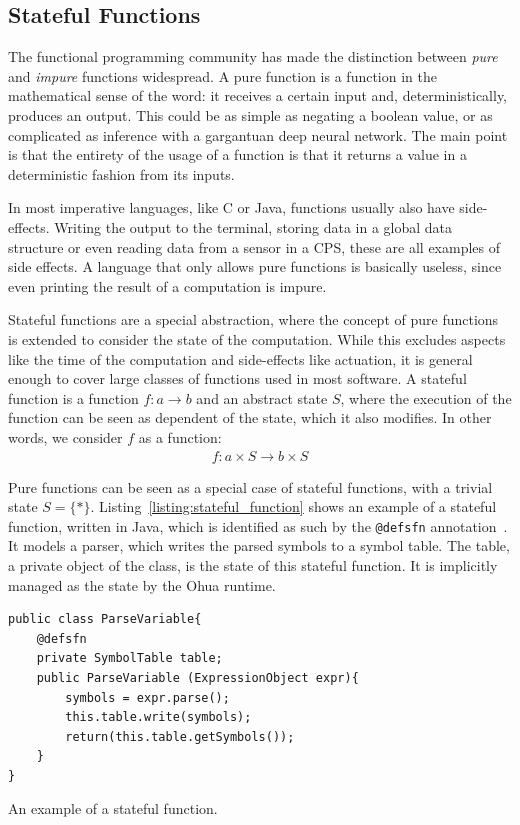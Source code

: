 \subsection{Stateful Functions}
The functional programming community has made the distinction between \emph{pure} and \emph{impure} functions widespread.
A pure function is a function in the mathematical sense of the word: it receives a certain input and, deterministically, produces an output.
This could be as simple as negating a boolean value, or as complicated as inference with a gargantuan deep neural network.
The main point is that the entirety of the usage of a function is that it returns a value in a deterministic fashion from its inputs.

In most imperative languages, like C or Java, functions usually also have side-effects. Writing the output to the terminal, storing data in a global data structure or even reading data from a sensor in a \ac{CPS}, these are all examples of side effects.
A language that only allows pure functions is basically useless, since even printing the result of a computation is impure.

Stateful functions are a special abstraction, where the concept of pure functions is extended to consider the state of the computation. 
While this excludes aspects like the time of the computation and side-effects like actuation, it is general enough to cover large classes of functions used in most software.
A stateful function is a function $f : a \rightarrow b$ and an abstract state $S$, where the execution of the function can be seen as dependent of the state, which it also modifies.
In other words, we consider $f$ as a function:
\begin{align}
  f : a \times S \rightarrow b \times S \label{eqn:state_thread}
\end{align}

Pure functions can be seen as a special case of stateful functions, with a trivial state $S = \{*\}$.
Listing~\ref{listing:stateful_function} shows an example of a stateful function, written in Java, which is identified as such by the \texttt{@defsfn} annotation~\cite{ertel_pmam18}.
It models a parser, which writes the parsed symbols to a symbol table.
The table, a private object of the class, is the state of this stateful function.
It is implicitly managed as the state by the Ohua runtime.

\begin{listing}
\begin{verbatim}
public class ParseVariable{
    @defsfn
    private SymbolTable table;
    public ParseVariable (ExpressionObject expr){
        symbols = expr.parse();
        this.table.write(symbols);
        return(this.table.getSymbols());
    }
}
\end{verbatim}
\caption{An example of a stateful function.}
\label{listing:stateful_function}
\end{listing}